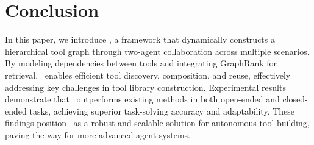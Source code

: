 \section{Conclusion}
\label{sec:conclusion}
\vspace{-5pt}
In this paper, we introduce \ours, a framework that dynamically constructs a hierarchical tool graph through two-agent collaboration across multiple scenarios. By modeling dependencies between tools and integrating GraphRank for retrieval, \ours\ enables efficient tool discovery, composition, and reuse, effectively addressing key challenges in tool library construction. Experimental results demonstrate that \ours\ outperforms existing methods in both open-ended and closed-ended tasks, achieving superior task-solving accuracy and adaptability. These findings position \ours\ as a robust and scalable solution for autonomous tool-building, paving the way for more advanced agent systems.
